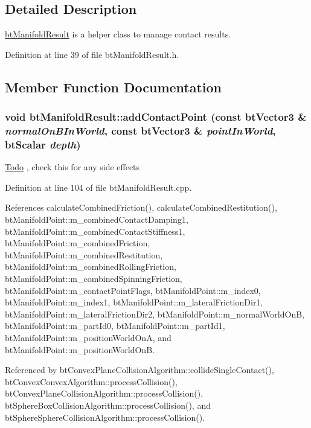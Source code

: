 \subsection{Detailed Description}
\hyperlink{classbt_manifold_result}{btManifoldResult} is a helper class to manage contact results. 

Definition at line 39 of file btManifoldResult.h.

\subsection{Member Function Documentation}
\hypertarget{classbt_manifold_result_ebe32f0c202d988d0458e88d768602c6}{
\subsubsection[addContactPoint]{\setlength{\rightskip}{0pt plus 5cm}void btManifoldResult::addContactPoint (const btVector3 \& {\em normalOnBInWorld}, \/  const btVector3 \& {\em pointInWorld}, \/  btScalar {\em depth})}}
\label{classbt_manifold_result_ebe32f0c202d988d0458e88d768602c6}




\begin{Desc}
\item[\hyperlink{todo__todo000015}{Todo}], check this for any side effects \end{Desc}


Definition at line 104 of file btManifoldResult.cpp.

References calculateCombinedFriction(), calculateCombinedRestitution(), btManifoldPoint::m\_\-combinedContactDamping1, btManifoldPoint::m\_\-combinedContactStiffness1, btManifoldPoint::m\_\-combinedFriction, btManifoldPoint::m\_\-combinedRestitution, btManifoldPoint::m\_\-combinedRollingFriction, btManifoldPoint::m\_\-combinedSpinningFriction, btManifoldPoint::m\_\-contactPointFlags, btManifoldPoint::m\_\-index0, btManifoldPoint::m\_\-index1, btManifoldPoint::m\_\-lateralFrictionDir1, btManifoldPoint::m\_\-lateralFrictionDir2, btManifoldPoint::m\_\-normalWorldOnB, btManifoldPoint::m\_\-partId0, btManifoldPoint::m\_\-partId1, btManifoldPoint::m\_\-positionWorldOnA, and btManifoldPoint::m\_\-positionWorldOnB.

Referenced by btConvexPlaneCollisionAlgorithm::collideSingleContact(), btConvexConvexAlgorithm::processCollision(), btConvexPlaneCollisionAlgorithm::processCollision(), btSphereBoxCollisionAlgorithm::processCollision(), and btSphereSphereCollisionAlgorithm::processCollision().

